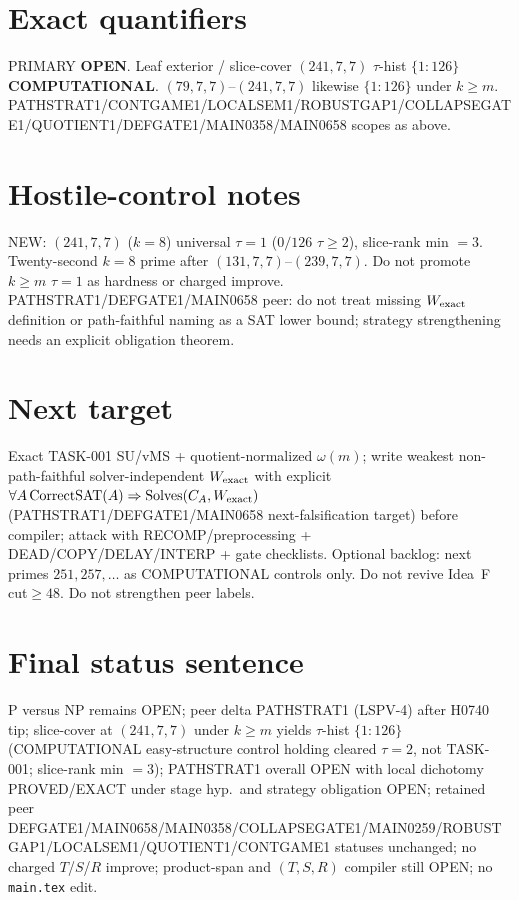 \documentclass[11pt]{article}
\begin{document}
\section*{Exact quantifiers}
PRIMARY \textbf{OPEN}. Leaf exterior / slice-cover $(241,7,7)$ $\tau$-hist $\{1{:}126\}$ \textbf{COMPUTATIONAL}.
$(79,7,7)$--$(241,7,7)$ likewise $\{1{:}126\}$ under $k{\ge}m$.
PATHSTRAT1/CONTGAME1/LOCALSEM1/ROBUSTGAP1/COLLAPSEGATE1/QUOTIENT1/DEFGATE1/MAIN0358/MAIN0658 scopes as above.

\section*{Hostile-control notes}
NEW: $(241,7,7)$ ($k{=}8$) universal $\tau{=}1$ ($0/126$ $\tau{\ge}2$), slice-rank min $=3$.
Twenty-second $k{=}8$ prime after $(131,7,7)$--$(239,7,7)$.
Do not promote $k{\ge}m$ $\tau{=}1$ as hardness or charged improve.
PATHSTRAT1/DEFGATE1/MAIN0658 peer: do not treat missing $W_{\rm exact}$ definition or path-faithful naming as a SAT lower bound;
strategy strengthening needs an explicit obligation theorem.

\section*{Next target}
Exact TASK-001 SU/vMS + quotient-normalized $\omega(m)$; write weakest non-path-faithful
solver-independent $W_{\rm exact}$ with explicit
$\forall A\,\mathrm{CorrectSAT}(A)\Rightarrow\mathrm{Solves}(C_A,W_{\rm exact})$
(PATHSTRAT1/DEFGATE1/MAIN0658 next-falsification target) before compiler;
attack with RECOMP/preprocessing + DEAD/COPY/DELAY/INTERP + gate checklists.
Optional backlog: next primes $251,257,\ldots$ as COMPUTATIONAL controls only.
Do not revive Idea~F cut$\ge48$. Do not strengthen peer labels.

\section*{Final status sentence}
P versus NP remains OPEN; peer delta PATHSTRAT1 (LSPV-4) after H0740 tip; slice-cover at $(241,7,7)$ under $k{\ge}m$ yields $\tau$-hist $\{1{:}126\}$ (COMPUTATIONAL easy-structure control holding cleared $\tau{=}2$, not TASK-001; slice-rank min $=3$); PATHSTRAT1 overall OPEN with local dichotomy PROVED/EXACT under stage hyp.\ and strategy obligation OPEN; retained peer DEFGATE1/MAIN0658/MAIN0358/COLLAPSEGATE1/MAIN0259/ROBUSTGAP1/LOCALSEM1/QUOTIENT1/CONTGAME1 statuses unchanged; no charged $T$/$S$/$R$ improve; product-span and $(T,S,R)$ compiler still OPEN; no \texttt{main.tex} edit.
\end{document}
